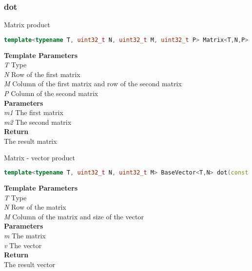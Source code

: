 \subsubsection{dot}
\begin{mdframed}
Matrix product
\begin{lstlisting}[language=C++]
template<typename T, uint32_t N, uint32_t M, uint32_t P> Matrix<T,N,P> dot(const Matrix<T,N,M>& m1, const Matrix<T,M,P>& m2) 
\end{lstlisting}
\textbf{Template Parameters} \\ 
\textit{T} Type \\ 
\textit{N} Row of the first matrix \\ 
\textit{M} Column of the first matrix and row of the second matrix \\ 
\textit{P} Column of the second matrix \\ 
\textbf{Parameters} \\ 
\textit{m1} The first matrix \\ 
\textit{m2} The second matrix \\ 
\textbf{Return} \\ 
The result matrix\\ 
\end{mdframed}

\begin{mdframed}
Matrix - vector product
\begin{lstlisting}[language=C++]
template<typename T, uint32_t N, uint32_t M> BaseVector<T,N> dot(const Matrix<T,N,M>& m, const BaseVector<T,M>& v) 
\end{lstlisting}
\textbf{Template Parameters} \\ 
\textit{T} Type \\ 
\textit{N} Row of the matrix \\ 
\textit{M} Column of the matrix and size of the vector \\ 
\textbf{Parameters} \\ 
\textit{m} The matrix \\ 
\textit{v} The vector \\ 
\textbf{Return} \\ 
The result vector\\ 
\end{mdframed}

